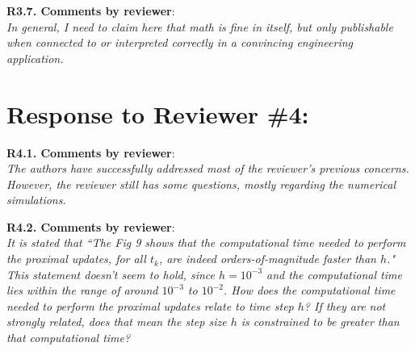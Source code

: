 \documentclass[12pt,onecolumn]{IEEEtran}
\newcommand{\blue}{\color{blue}}
\newcommand{\nib}{\noindent  {\bf Response:} }
\begin{document}
\noindent
{\bf R3.7. Comments by reviewer}:\\
{\em In general, I need to claim here that math is fine in itself, but only publishable when connected to or interpreted correctly in a convincing engineering application.}
 
{\nib \blue{Thank you. We have done our best to clarify these connections and interpretations. We hope you approve.}}



\newpage
\section*{\large \bf Response to Reviewer \#4:}

\noindent
{\bf R4.1. Comments by reviewer}:\\
{\em The authors have successfully addressed most of the reviewer's previous concerns. However, the reviewer still has some questions, mostly regarding the numerical simulations.}

{\nib \blue{Thank you. Please find our itemized responses to the questions related to numerical simulations.}}


\noindent
{\bf R4.2. Comments by reviewer}:\\
{\em It is stated that ``The Fig 9 shows that the computational time needed to perform the proximal updates, for all $t_k$, are indeed orders-of-magnitude faster than $h$."
This statement doesn't seem to hold, since $h=10^{-3}$ and the computational time lies within the range of around $10^{-3}$ to $10^{-2}$. How does the computational time needed to perform the proximal updates relate to time step $h$? If they are not strongly related, does that mean the step size $h$ is constrained to be greater than that computational time?}
\end{document}
